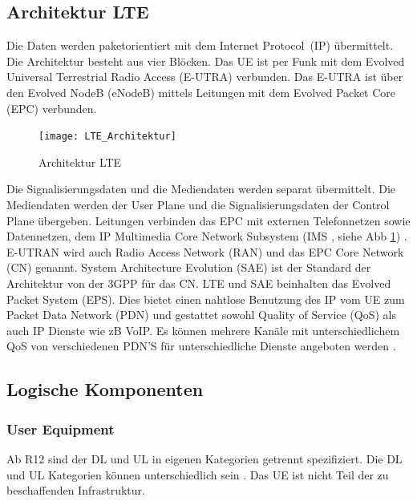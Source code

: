 \subsection{Architektur LTE}
\label{subsec:architektur}
Die Daten werden paketorientiert mit dem Internet Protocol~(IP) übermittelt. Die Architektur besteht aus vier Blöcken. Das UE ist per Funk mit dem Evolved Universal Terrestrial Radio Access (E-UTRA) verbunden. Das E-UTRA ist über den Evolved NodeB (eNodeB) mittels Leitungen mit dem Evolved Packet Core (EPC) verbunden.
\begin{figure}[H]
	\centering
	\texttt{[image: LTE\_Architektur]}
	\caption{Architektur LTE \protect\cite{Fir19}}
	\label{fig:bildarchitektur}
\end{figure}
Die Signalisierungsdaten und die Mediendaten werden separat übermittelt. Die Mediendaten werden der User Plane und die Signalisierungsdaten der Control Plane übergeben. Leitungen verbinden das EPC mit externen Telefonnetzen sowie Datennetzen, dem IP Multimedia Core Network Subsystem (IMS , siehe Abb \ref{fig:bildarchitektur}) \cite{Fir19}.
E-UTRAN wird auch Radio Access Network (RAN) und das EPC Core Network (CN) genannt. System Architecture Evolution (SAE) ist der Standard der Architektur von der 3GPP für das CN. LTE und SAE beinhalten das Evolved Packet System (EPS). Dies bietet einen nahtlose Benutzung des IP vom UE zum Packet Data Network (PDN) und gestattet sowohl Quality of Service (QoS) als auch IP Dienste wie zB VoIP. Es können mehrere Kanäle mit unterschiedlichem QoS von verschiedenen PDN'S für unterschiedliche Dienste angeboten werden \cite{Ses11}.
\subsection{Logische Komponenten}
\label{subsec:logkomponenten}
\subsubsection{User Equipment}
\label{subsubsec:ue}
Ab R12 sind der DL und UL in eigenen Kategorien getrennt spezifiziert. Die DL und UL Kategorien können unterschiedlich sein \cite{GPP19}. Das UE ist nicht Teil der zu beschaffenden Infrastruktur. 
